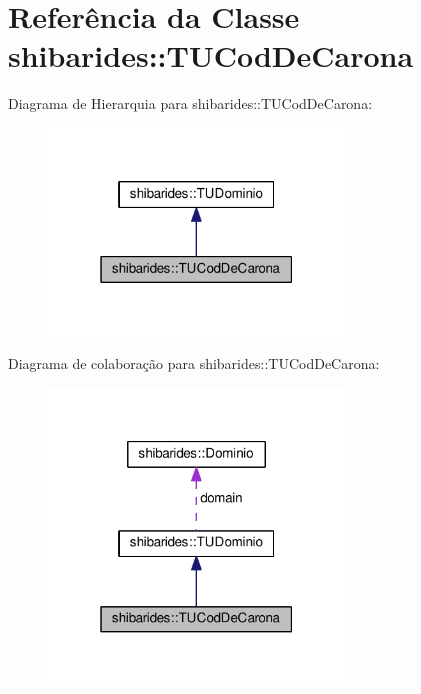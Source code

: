 \hypertarget{classshibarides_1_1TUCodDeCarona}{}\section{Referência da Classe shibarides\+:\+:T\+U\+Cod\+De\+Carona}
\label{classshibarides_1_1TUCodDeCarona}


Diagrama de Hierarquia para shibarides\+:\+:T\+U\+Cod\+De\+Carona\+:\nopagebreak
\begin{figure}[H]
\begin{center}
\leavevmode
\includegraphics[width=223pt]{classshibarides_1_1TUCodDeCarona__inherit__graph}
\end{center}
\end{figure}


Diagrama de colaboração para shibarides\+:\+:T\+U\+Cod\+De\+Carona\+:\nopagebreak
\begin{figure}[H]
\begin{center}
\leavevmode
\includegraphics[width=223pt]{classshibarides_1_1TUCodDeCarona__coll__graph}
\end{center}
\end{figure}
